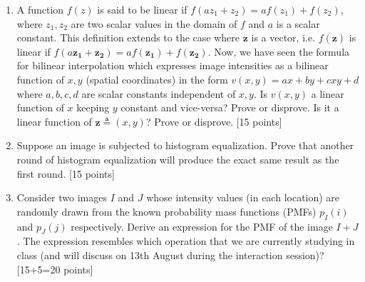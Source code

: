 \documentclass[11pt]{article}
\begin{document}
\begin{enumerate}
    \item A function $f(z)$ is said to be linear if $f(az_1 + z_2) = a f(z_1) + f(z_2)$, where $z_1, z_2$ are two scalar values in the domain of $f$ and $a$ is a scalar constant. This definition extends to the case where $\boldsymbol{z}$ is a vector, i.e. $f(\boldsymbol{z})$ is linear if $f(a \boldsymbol{z_1} + \boldsymbol{z_2}) = a f(\boldsymbol{z_1}) + f(\boldsymbol{z_2})$.
          Now, we have seen the formula for bilinear interpolation which expresses image intensities as a bilinear function of $x,y$ (spatial coordinates) in the form $v(x,y) = ax + by + cxy + d$ where $a,b,c,d$ are scalar constants independent of $x,y$. Is $v(x,y)$ a linear function of $x$ keeping $y$ constant and vice-versa? Prove or disprove. Is it a linear function of $\boldsymbol{z} \triangleq (x,y)$? Prove or disprove. \textsf{[15 points]}

    \item Suppose an image is subjected to histogram equalization. Prove that another round of histogram equalization will produce the exact same result as the first round. \textsf{[15 points]}

    \item Consider two images $I$ and $J$ whose intensity values (in each location) are randomly drawn from the known probability mass functions (PMFs) $p_I(i)$ and $p_J(j)$ respectively. Derive an expression for the PMF of the image $I+J$. The expression resembles which operation that we are currently studying in class (and will discuss on 13th August during the interaction session)? \textsf{[15+5=20 points]}


\end{enumerate}
\end{document}
